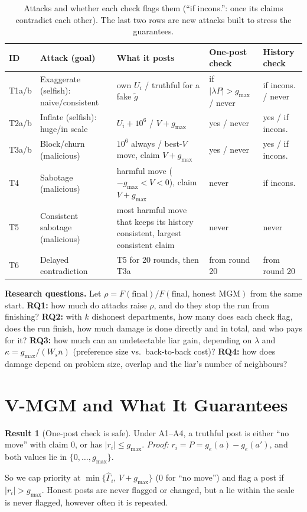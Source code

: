 \documentclass{article}
\theoremstyle{definition}
\newtheorem{result}{Result}
\newcommand{\1}{\mathbf{1}}
\newcommand{\gmax}{g_{\max}}
\begin{document}
\begin{table}[!t]
\caption{Attacks and whether each check flags them (``if incons.'': once its claims contradict each other). The last two rows are new attacks built to stress the guarantees.}
\label{tab:attacks}
\centering\footnotesize
\setlength{\tabcolsep}{4pt}\begin{tabularx}{\linewidth}{@{}>{\raggedright\arraybackslash}p{0.75cm}>{\raggedright\arraybackslash}p{4.1cm}X>{\raggedright\arraybackslash}p{2.0cm}>{\raggedright\arraybackslash}p{2.0cm}@{}}
\toprule
ID & Attack (goal) & What it posts & One-post check & History check \\
\midrule
T1a/b & Exaggerate (selfish): naive/consistent & own $U_i$ / truthful for a fake $\tilde g$ & if $|\lambda P|>\gmax$ / never & if incons. / never \\
T2a/b & Inflate (selfish): huge/in scale & $U_i+10^6$ / $V+\gmax$ & yes / never & yes / if incons. \\
T3a/b & Block/churn (malicious) & $10^6$ always / best-$V$ move, claim $V+\gmax$ & yes / never & yes / if incons. \\
T4 & Sabotage (malicious) & harmful move ($-\gmax<V<0$), claim $V+\gmax$ & never & if incons. \\
T5 & Consistent sabotage (malicious) & most harmful move that keeps its history consistent, largest consistent claim & never & never \\
T6 & Delayed contradiction & T5 for 20 rounds, then T3a & from round 20 & from round 20 \\
\bottomrule
\end{tabularx}
\end{table}

\textbf{Research questions.} Let $\rho=F(\text{final})/F(\text{final, honest MGM})$ from the same start. \textbf{RQ1:} how much do attacks raise $\rho$, and do they stop the run from finishing? \textbf{RQ2:} with $k$ dishonest departments, how many does each check flag, does the run finish, how much damage is done directly and in total, and who pays for it? \textbf{RQ3:} how much can an undetectable liar gain, depending on $\lambda$ and $\kappa=\gmax/(W_s\bar n)$ (preference size vs.\ back-to-back cost)? \textbf{RQ4:} how does damage depend on problem size, overlap and the liar's number of neighbours?

\section{V-MGM and What It Guarantees}
\label{sec:sol}
\begin{result}[One-post check is safe]
\label{res:one}
Under A1--A4, a truthful post is either ``no move'' with claim $0$, or has $|r_i|\le\gmax$. \emph{Proof:} $r_i=P=g_e(a)-g_e(a')$, and both values lie in $\{0,\dots,\gmax\}$.
\end{result}
So we cap priority at $\min\{\hat\Gamma_i,\,V+\gmax\}$ ($0$ for ``no move'') and flag a post if $|r_i|>\gmax$. Honest posts are never flagged or changed, but a lie within the scale is never flagged, however often it is repeated.
\end{document}
